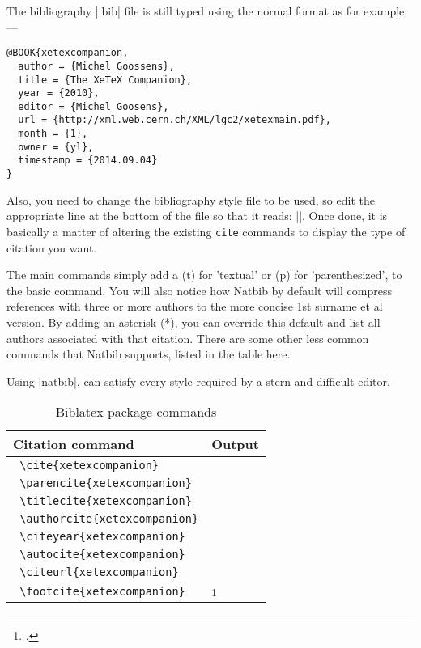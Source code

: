 \begin{refsection}
The bibliography |.bib| file is still typed using the normal format as for example:---

\begin{verbatim}
@BOOK{xetexcompanion,
  author = {Michel Goossens},
  title = {The XeTeX Companion},
  year = {2010},
  editor = {Michel Goosens},
  url = {http://xml.web.cern.ch/XML/lgc2/xetexmain.pdf},
  month = {1},
  owner = {yl},
  timestamp = {2014.09.04}
}

\end{verbatim}



Also, you need to change the bibliography style file to be used, so edit the appropriate line at the bottom of the file so that it reads: ||. Once done, it is basically a matter of altering the existing \texttt{cite} commands to display the type of citation you want.


The main commands simply add a (t)  for 'textual' or (p) for 'parenthesized', to the basic  command. You will also notice how Natbib by default will compress references with three or more authors to the more concise 1st surname et al version. By adding an asterisk (*), you can override this default and list all authors associated with that citation. There are some other less common commands that Natbib supports, listed in the table here.

Using |natbib|, can satisfy every style required by a stern and difficult editor.


\begin{longtable}{lp{8cm}}
\caption{Biblatex package commands}\\
\toprule
Citation command	&Output\\
\midrule
\verb+ \cite{xetexcompanion}+	&\cite{xetexcompanion}\\
\verb+ \parencite{xetexcompanion}+	&\parencite{xetexcompanion}\\
\verb+ \titlecite{xetexcompanion}+	&\citetitle{xetexcompanion}\\
\verb+ \authorcite{xetexcompanion}+	&\citeauthor{xetexcompanion}\\
\verb+ \citeyear{xetexcompanion}+	&\citeyear{xetexcompanion} \\
\verb+ \autocite{xetexcompanion}+	&\autocite{xetexcompanion}\\
\verb+ \citeurl{xetexcompanion}+	&\citeurl{xetexcompanion}\\
\verb+ \footcite{xetexcompanion}+	&\footcite[p. 22]{xetexcompanion}\\
\bottomrule
\end{longtable}


\end{refsection}
